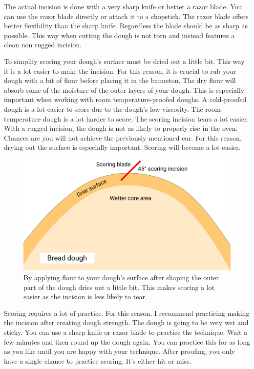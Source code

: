 The actual incision is done with a very sharp knife or better a razor
blade. You can use the razor blade directly or attach it to a chopstick.
The razor blade offers better flexibility than the sharp knife.
Regardless the blade should be as sharp as possible. This way when cutting
the dough is not torn and instead features a clean non rugged incision.

To simplify scoring your dough's surface must be dried out a little bit.
This way it is a lot easier to make the incision.
For this reason, it is crucial to rub your dough with a bit of flour
before placing it in the banneton. The dry flour will absorb some of the
moisture of the outer layers of your dough. This is especially important
when working with room temperature-proofed doughs. A cold-proofed dough
is a lot easier to score due to the dough's low viscosity. The room-temperature
dough is a lot harder to score. The scoring incision tears a lot
easier. With a rugged incision, the dough is not as likely to properly
rise in the oven. Chances are you will not achieve the previously mentioned
ear. For this reason, drying out the surface is especially important. Scoring
will become a lot easier.

\begin{figure}[htb!]
  \includegraphics[width=\textwidth]{dry-dough-surface}
  \caption{By applying flour to your dough's surface after shaping the outer part
  of the dough dries out a little bit. This makes scoring a lot easier as the incision
  is less likely to tear.}
  \label{fig:dried-out-dough-scoring}
\end{figure}


Scoring requires a lot of practice. For this reason, I recommend
practicing making the incision after creating dough strength. The dough
is going to be very wet and sticky. You can use a sharp knife or razor
blade to practice the technique. Wait a few minutes and then round
up the dough again. You can practice this for as long as you like
until you are happy with your technique. After proofing, you only
have a single chance to practice scoring. It's either hit or miss.

